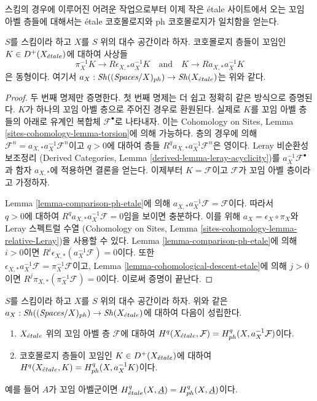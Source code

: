 \noindent
스킴의 경우에 이루어진 어려운 작업으로부터 이제 작은 \'etale
사이트에서 오는 꼬임 아벨 층들에 대해서는 \'etale 코호몰로지와
ph 코호몰로지가 일치함을 얻는다.

\begin{lemma}
\label{lemma-cohomological-descent-etale-ph}
$S$를 스킴이라 하고 $X$를 $S$ 위의 대수 공간이라 하자.
코호몰로지 층들이 꼬임인 $K \in D^+(X_{\acute{e}tale})$에 대하여 사상들
$$
\pi_X^{-1}K \longrightarrow R\epsilon_{X, *}a_X^{-1}K
\quad\text{and}\quad
K \longrightarrow Ra_{X, *}a_X^{-1}K
$$
은 동형이다. 여기서
$a_X : \mathop{\mathit{Sh}}\nolimits((\textit{Spaces}/X)_{ph}) \to \mathop{\mathit{Sh}}\nolimits(X_{\acute{e}tale})$는 위와 같다.
\end{lemma}

\begin{proof}
두 번째 명제만 증명한다. 첫 번째 명제는 더 쉽고 정확히 같은 방식으로
증명된다. $K$가 하나의 꼬임 아벨 층으로 주어진 경우로 환원된다.
실제로 $K$를 꼬임 아벨 층들의 아래로 유계인 복합체
$\mathcal{F}^\bullet$로 나타내자. 이는 Cohomology on Sites, Lemma
\ref{sites-cohomology-lemma-torsion}에 의해 가능하다.
층의 경우에 의해
$\mathcal{F}^n = a_{X, *} a_X^{-1} \mathcal{F}^n$이고
$q > 0$에 대하여 층들 $R^qa_{X, *}a_X^{-1}\mathcal{F}^n$은 영이다.
Leray 비순환성 보조정리
(Derived Categories, Lemma \ref{derived-lemma-leray-acyclicity})를
$a_X^{-1}\mathcal{F}^\bullet$과 함자 $a_{X, *}$에 적용하면 결론을
얻는다. 이제부터 $K = \mathcal{F}$이고 $\mathcal{F}$가 꼬임 아벨
층이라고 가정하자.

\medskip\noindent
Lemma \ref{lemma-comparison-ph-etale}에 의해
$a_{X, *}a_X^{-1}\mathcal{F} = \mathcal{F}$이다. 따라서\\
$q > 0$에 대하여 $R^qa_{X, *}a_X^{-1}\mathcal{F} = 0$임을 보이면
충분하다. 이를 위해
$a_X = \epsilon_X \circ \pi_X$와 Leray 스펙트럴 수열
(Cohomology on Sites, Lemma
\ref{sites-cohomology-lemma-relative-Leray})을 사용할 수 있다.
Lemma \ref{lemma-comparison-ph-etale}에 의해 $i > 0$이면
$R^i\epsilon_{X, *}(a_X^{-1}\mathcal{F}) = 0$이다. 또한\\
$\epsilon_{X, *}a_X^{-1}\mathcal{F} = \pi_X^{-1}\mathcal{F}$이고,
Lemma \ref{lemma-cohomological-descent-etale}에 의해 $j > 0$이면
$R^j\pi_{X, *}(\pi_X^{-1}\mathcal{F}) = 0$이다.
이로써 증명이 끝난다.
\end{proof}

\begin{lemma}
\label{lemma-compare-cohomology-etale-ph}
$S$를 스킴이라 하고 $X$를 $S$ 위의 대수 공간이라 하자.
위와 같은 $a_X : \mathop{\mathit{Sh}}\nolimits((\textit{Spaces}/X)_{ph}) \to \mathop{\mathit{Sh}}\nolimits(X_{\acute{e}tale})$에
대하여 다음이 성립한다.
\begin{enumerate}
\item $X_{\acute{e}tale}$ 위의 꼬임 아벨 층 $\mathcal{F}$에 대하여
$H^q(X_{\acute{e}tale}, \mathcal{F}) = H^q_{ph}(X, a_X^{-1}\mathcal{F})$이다.
\item 코호몰로지 층들이 꼬임인 $K \in D^+(X_{\acute{e}tale})$에 대하여\\
$H^q(X_{\acute{e}tale}, K) = H^q_{ph}(X, a_X^{-1}K)$이다.
\end{enumerate}
예를 들어 $A$가 꼬임 아벨군이면
$H^q_{\acute{e}tale}(X, \underline{A}) = H^q_{ph}(X, \underline{A})$이다.
\end{lemma}

